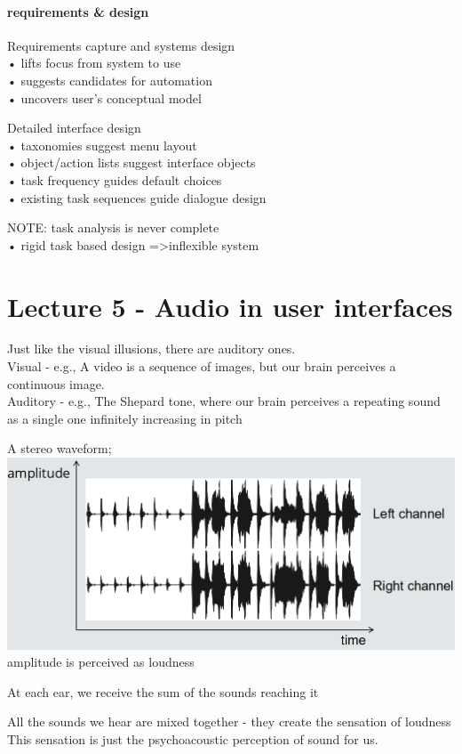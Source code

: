 \documentclass[]{project_plan}
\begin{document}
\subsubsection{requirements \& design}
Requirements capture and systems design\\
• lifts focus from system to use\\
• suggests candidates for automation\\
• uncovers user's conceptual model

Detailed interface design\\
• taxonomies suggest menu layout\\
• object/action lists suggest interface objects\\
• task frequency guides default choices\\
• existing task sequences guide dialogue design

NOTE: task analysis is never complete\\
• rigid task based design =\textgreater inflexible system

\chapter{Lecture 5 - Audio in user interfaces}
Just like the visual illusions, there are auditory ones.\\
Visual - e.g., A video is a sequence of images, but our brain perceives a continuous image.\\
Auditory - e.g., The Shepard tone, where our brain perceives a repeating sound as a single one infinitely increasing in pitch

A stereo waveform;\\
\includegraphics[width=\linewidth]{stereo_waveform.png}
amplitude is perceived as loudness

At each ear, we receive the sum of the sounds reaching it

All the sounds we hear are mixed together - they create the sensation of loudness\\
This sensation is just the psychoacoustic perception of sound for us.
\end{document}
